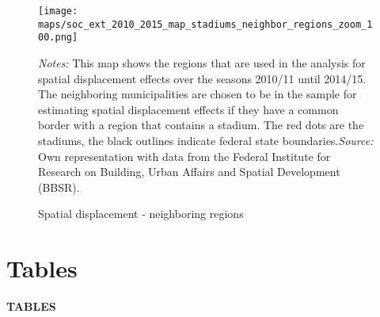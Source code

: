 \documentclass[11pt, a4paper]{article} %
\begin{document}
\vspace*{\fill}
\begin{figure}[H]\centering
	\caption{Spatial displacement - neighboring regions}\label{fig_soc_ext:map_neighboring_regions}
	\texttt{[image: maps/soc\_ext\_2010\_2015\_map\_stadiums\_neighbor\_regions\_zoom\_100.png]}
	\begin{minipage}{0.95\linewidth}
		\scriptsize{\emph{Notes:} This map shows the regions that are used in the analysis for spatial displacement effects over the seasons 2010/11 until 2014/15. The neighboring municipalities are chosen to be in the sample for estimating spatial displacement effects if they have a common border with a region that contains a stadium. The red dots are the stadiums, the black outlines indicate federal state boundaries.\newline \emph{Source:} Own representation with data from the Federal Institute for Research on Building, Urban Affairs and Spatial Development (BBSR).}
	\end{minipage}
\end{figure}
\vspace*{\fill}\clearpage








\newpage
\TODO\section{Tables}
\vspace*{\fill}
{\Huge \begin{center}\textbf{TABLES}\end{center}}
\vspace*{\fill}\clearpage
\end{document}
